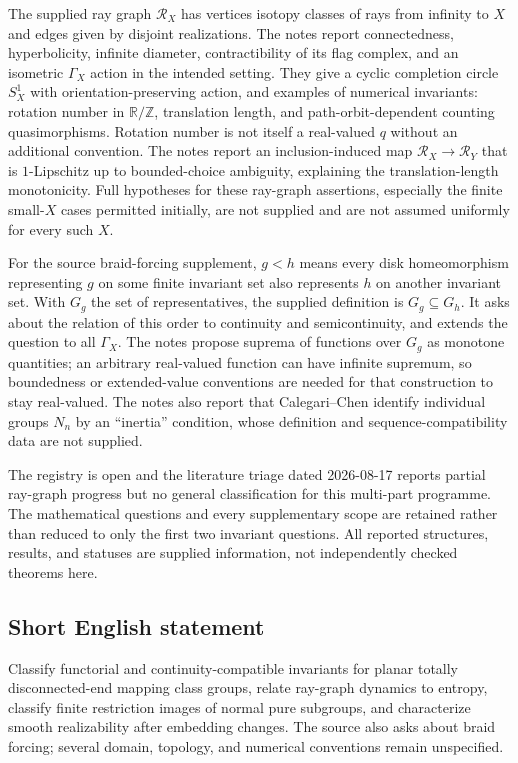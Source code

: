 \documentclass[11pt]{article}
\newcommand{\Z}{\mathbb{Z}}
\newcommand{\R}{\mathbb{R}}
\begin{document}
The supplied ray graph $\mathcal R_X$ has vertices isotopy classes of rays from infinity to $X$ and edges given by disjoint realizations. The notes report connectedness, hyperbolicity, infinite diameter, contractibility of its flag complex, and an isometric $\Gamma_X$ action in the intended setting. They give a cyclic completion circle $S_X^1$ with orientation-preserving action, and examples of numerical invariants: rotation number in $\R/\Z$, translation length, and path-orbit-dependent counting quasimorphisms. Rotation number is not itself a real-valued $q$ without an additional convention. The notes report an inclusion-induced map $\mathcal R_X\to\mathcal R_Y$ that is $1$-Lipschitz up to bounded-choice ambiguity, explaining the translation-length monotonicity. Full hypotheses for these ray-graph assertions, especially the finite small-$X$ cases permitted initially, are not supplied and are not assumed uniformly for every such $X$.

For the source braid-forcing supplement, $g<h$ means every disk homeomorphism representing $g$ on some finite invariant set also represents $h$ on another invariant set. With $G_g$ the set of representatives, the supplied definition is $G_g\subseteq G_h$. It asks about the relation of this order to continuity and semicontinuity, and extends the question to all $\Gamma_X$. The notes propose suprema of functions over $G_g$ as monotone quantities; an arbitrary real-valued function can have infinite supremum, so boundedness or extended-value conventions are needed for that construction to stay real-valued. The notes also report that Calegari--Chen identify individual groups $N_n$ by an ``inertia'' condition, whose definition and sequence-compatibility data are not supplied.

The registry is open and the literature triage dated 2026-08-17 reports partial ray-graph progress but no general classification for this multi-part programme. The mathematical questions and every supplementary scope are retained rather than reduced to only the first two invariant questions. All reported structures, results, and statuses are supplied information, not independently checked theorems here.
\subsection{Short English statement}
Classify functorial and continuity-compatible invariants for planar totally disconnected-end mapping class groups, relate ray-graph dynamics to entropy, classify finite restriction images of normal pure subgroups, and characterize smooth realizability after embedding changes. The source also asks about braid forcing; several domain, topology, and numerical conventions remain unspecified.
\end{document}
